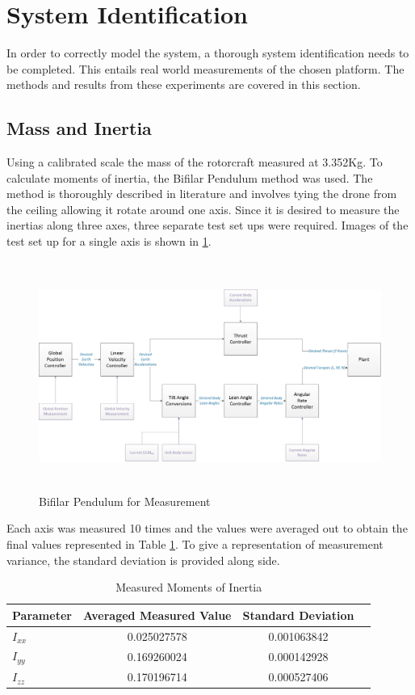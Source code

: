 	\section{System Identification}
	In order to correctly model the system, a thorough system identification needs to be completed. This entails real world measurements of the chosen platform. The methods and results from these experiments are covered in this section.
	
		\subsection{Mass and Inertia}
		Using a calibrated scale the mass of the rotorcraft measured at 3.352Kg. To calculate moments of inertia, the Bifilar Pendulum method was used. The method is thoroughly described in literature and involves tying the drone from the ceiling allowing it rotate around one axis. Since it is desired to measure the inertias along three axes, three separate test set ups were required. Images of the test set up for a single axis is shown in \ref{IM_BifilarPendulum}. 
		
		\begin{figure}[H]
			\centering
			\includegraphics[height = 7.5cm]{../References/Diagrams/ControlDiagram.jpg}
			\caption{Bifilar Pendulum for Measurement}
			\label{IM_BifilarPendulum}
		\end{figure}
		
		Each axis was measured 10 times and the values were averaged out to obtain the final values represented in Table \ref{TAB_MomentOfInertia}. To give a representation of measurement variance, the standard deviation is provided along side.
				
		\begin{table}[!]
			\centering
			\begin{tabular}{l | c | c | c |}
				Parameter & Averaged Measured Value & Standard Deviation\\
				\hline\hline
				$I_{xx}$ & 0.025027578 & 0.001063842\\
				$I_{yy}$ & 0.169260024 & 0.000142928\\
				$I_{zz}$ & 0.170196714 & 0.000527406\\
			\end{tabular}
			\label{TAB_MomentOfInertia}
			\caption{Measured Moments of Inertia}
		\end{table}
		
